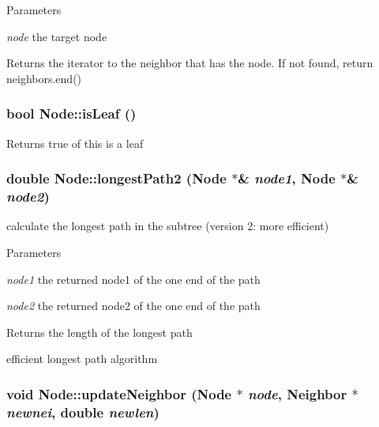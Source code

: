 \begin{DoxyParams}{Parameters}
\item[{\em node}]the target node \end{DoxyParams}
\begin{DoxyReturn}{Returns}
the iterator to the neighbor that has the node. If not found, return neighbors.end() 
\end{DoxyReturn}
\hypertarget{classNode_a3a61dca67d5ad06cacb8c48eb6374973}{
\subsubsection[{isLeaf}]{\setlength{\rightskip}{0pt plus 5cm}bool Node::isLeaf ()}}
\label{classNode_a3a61dca67d5ad06cacb8c48eb6374973}
\begin{DoxyReturn}{Returns}
true of this is a leaf 
\end{DoxyReturn}
\hypertarget{classNode_a327b0ab1379f0dc6ad4062e3b253dd6f}{
\subsubsection[{longestPath2}]{\setlength{\rightskip}{0pt plus 5cm}double Node::longestPath2 ({\bf Node} $\ast$\& {\em node1}, \/  {\bf Node} $\ast$\& {\em node2})}}
\label{classNode_a327b0ab1379f0dc6ad4062e3b253dd6f}
calculate the longest path in the subtree (version 2: more efficient) 
\begin{DoxyParams}{Parameters}
\item[{\em node1}]the returned node1 of the one end of the path \item[{\em node2}]the returned node2 of the one end of the path \end{DoxyParams}
\begin{DoxyReturn}{Returns}
the length of the longest path
\end{DoxyReturn}
efficient longest path algorithm \hypertarget{classNode_a0994f789ab4030889f70e5b69bcc57b3}{
\subsubsection[{updateNeighbor}]{\setlength{\rightskip}{0pt plus 5cm}void Node::updateNeighbor ({\bf Node} $\ast$ {\em node}, \/  {\bf Neighbor} $\ast$ {\em newnei}, \/  double {\em newlen})}}
